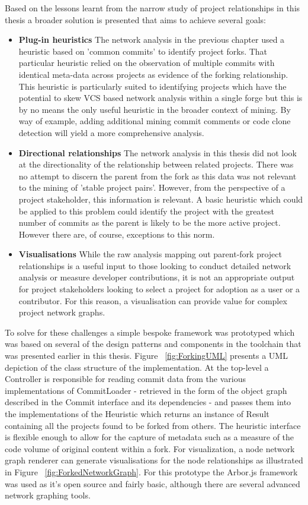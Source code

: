 Based on the lessons learnt from the narrow study of project relationships in this thesis a broader solution is presented that aims to achieve several goals:

\begin{itemize}
\item  \textbf{Plug-in heuristics} The network analysis in the previous chapter used a heuristic based on 'common commits' to identify project forks. That particular heuristic relied on the observation of multiple commits with identical meta-data across projects as evidence of the forking relationship. This heuristic is particularly suited to identifying projects which have the potential to skew VCS based network analysis within a single forge but this is by no means the only useful heuristic in the broader context of mining. By way of example, adding additional mining commit comments or code clone detection will yield a more comprehensive analysis.
\item  \textbf{Directional relationships} The network analysis in this thesis did not look at the directionality of the relationship between related projects. There was no attempt to discern the parent from the fork as this data was not relevant to the mining of 'stable project pairs'. However, from the perspective of a project stakeholder, this information is relevant. A basic heuristic which could be applied to this problem could identify the project with the greatest number of commits as the parent is likely to be the more active project. However there are, of course, exceptions to this norm.
\item  \textbf{Visualisations} While the raw analysis mapping out parent-fork project relationships is a useful input to those looking to conduct detailed network analysis or measure developer contributions, it is not an appropriate output for project stakeholders looking to select a project for adoption as a user or a contributor. For this reason, a visualisation can provide value for complex project network graphs.
\end{itemize}

To solve for these challenges a simple bespoke framework was prototyped which was based on several of the design patterns and components in the toolchain that was presented earlier in this thesis. Figure ~\ref{fig:ForkingUML} presents a UML depiction of the class structure of the implementation. At the top-level a Controller is responsible for reading commit data from the various implementations of CommitLoader - retrieved in the form of the object graph described in the Commit interface and its dependencies - and passes them into the implementations of the Heuristic which returns an instance of Result containing all the projects found to be forked from others. The heuristic interface is flexible enough to allow for the capture of metadata such as a measure of the code volume of original content within a fork. For visualization, a node network graph renderer can generate visualisations for the node relationships as illustrated in Figure ~\ref{fig:ForkedNetworkGraph}. For this prototype the Arbor.js framework was used as it's open source and fairly basic, although there are several advanced network graphing tools.

